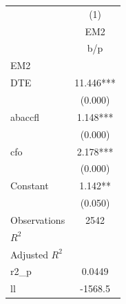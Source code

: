 {
\def\sym#1{\ifmmode^{#1}\else\(^{#1}\)\fi}
\begin{tabular}{l*{1}{c}}
\hline\hline
                    &\multicolumn{1}{c}{(1)}\\
                    &\multicolumn{1}{c}{EM2}\\
                    &         b/p   \\
\hline
EM2                 &               \\
DTE                 &      11.446***\\
                    &     (0.000)   \\
abaccfl             &       1.148***\\
                    &     (0.000)   \\
cfo                 &       2.178***\\
                    &     (0.000)   \\
Constant            &       1.142** \\
                    &     (0.050)   \\
\hline
Observations        &        2542   \\
\(R^{2}\)           &               \\
Adjusted \(R^{2}\)  &               \\
r2\_p                &      0.0449   \\
ll                  &     -1568.5   \\
\hline\hline
\end{tabular}
}
